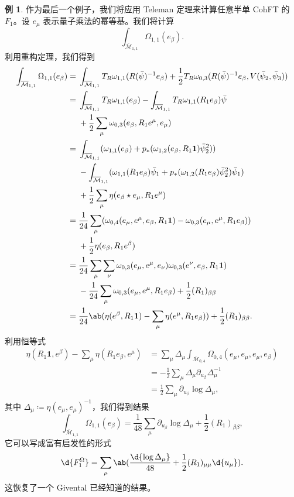 \documentclass{amsart}
\theoremstyle{definition}
\newtheorem{exm}[thm]{例}
\theoremstyle{remark}
\theoremstyle{plain}
\theoremstyle{definition}
\theoremstyle{remark}
\newcommand{\Mbar}{\overline{\mathcal{M}}}
\newcommand{\1}{\mathbf{1}}
\newcommand{\2}{\mathbf{2}}
\newcommand{\3}{\mathbf{3}}
\begin{document}
\begin{exm}
    作为最后一个例子，我们将应用 Teleman 定理来计算任意半单 CohFT 的 $F_1$。设 $e_{\mu}$ 表示量子乘法的幂等基。我们将计算
    \[ \int_{\Mbar_{1,1}} \Omega_{1,1}(e_{\beta}). \]
    利用重构定理，我们得到
    \begin{align*}
        \int_{\Mbar_{1,1}}\Omega_{1,1}(e_{\beta}) ={}& \int_{\Mbar_{1,1}} T_R \omega_{1,1}(R(\bar{\psi})^{-1} e_{\beta}) + \frac{1}{2} T_R \omega_{0,3}(R(\bar{\psi})^{-1} e_{\beta}, V(\bar{\psi}_2, \bar{\psi}_3)) \\
        ={}& \int_{\Mbar_{1,1}}T_R\omega_{1,1}(e_{\beta}) - \int_{\Mbar_{1,1}} T_R \omega_{1,1}(R_1 e_{\beta})\bar{\psi} \\
        &+ \frac{1}{2}\sum_{\mu}  \omega_{0,3}(e_{\beta}, R_1 e^{\mu}, e_{\mu}) \\
        ={}& \int_{\Mbar_{1,1}} ( \omega_{1,1}(e_{\beta}) + p_* ( \omega_{1,2}(e_{\beta}, R_1 \1) \bar{\psi}_2^2 )) \\
        &- \int_{\Mbar_{1,1}} (\omega_{1,1}(R_1 e_{\beta})\bar{\psi}_1 + p_* ( \omega_{1,2}(R_1 e_{\beta}) \bar{\psi}_2^2 ) \bar{\psi}_1) \\
        &+ \frac{1}{2} \sum_{\mu} \eta(e_{\beta} \star e_{\mu}, R_1 e^{\mu}) \\
        ={}& \frac{1}{24} \sum_{\mu} ( \omega_{0,4}(e_{\mu}, e^{\mu}, e_{\beta}, R_1 \1) -\omega_{0,3}(e_{\mu}, e^{\mu}, R_1 e_{\beta}) )\\
        &+ \frac{1}{2} \eta(e_{\beta}, R_1 e^{\beta}) \\
        ={}& \frac{1}{24} \sum_{\mu}\sum_{\nu} \omega_{0,3}(e_{\mu}, e^{\mu}, e_{\nu})\omega_{0,3}(e^{\nu}, e_{\beta}, R_1 \1) \\
        &-\frac{1}{24} \sum_{\mu} \omega_{0,3}(e_{\mu}, e^{\mu}, R_1 e_{\beta}) + \frac{1}{2} (R_1)_{\beta\beta} \\
        ={}& \frac{1}{24} \ab(\eta(e^{\beta}, R_1 \1) - \sum_{\mu} \eta(e^{\mu}, R_1 e_{\beta})) + \frac{1}{2} (R_1)_{\beta\beta}.
    \end{align*}
    利用恒等式
    \begin{align*}
        \eta(R_1 \1, e^{\beta}) - \sum_{\mu} \eta(R_1 e_{\beta}, e^{\mu}) &= \sum_{\mu} \Delta_{\mu} \int_{\Mbar_{0,4}} \Omega_{0,4}(e_{\mu}, e_{\mu}, e_{\mu}, e_{\beta}) \\
        &= -\frac{1}{2}\sum_{\mu} \Delta_{\mu} \partial_{u_{\beta}} \Delta_{\mu}^{-1} \\
        &= \frac{1}{2} \sum_{\mu} \partial_{u_{\beta}} \log \Delta_{\mu},
    \end{align*}
    其中 $\Delta_{\mu} \coloneqq \eta(e_{\mu}, e_{\mu})^{-1}$，我们得到结果
    \[ \int_{\Mbar_{1,1}} \Omega_{1,1}(e_{\beta}) = \frac{1}{48} \sum_{\mu} \partial_{u_{\beta}} \log \Delta_{\mu} + \frac{1}{2} (R_1)_{\beta\beta}, \]
    它可以写成富有启发性的形式
    \[ \d{F_1^{\Omega}} = \sum_{\mu} \ab( \frac{\d{\log \Delta_{\mu}}}{48} + \frac{1}{2} (R_1)_{\mu\mu} \d{u_{\mu}} ). \]
    这恢复了一个 Givental 已经知道的结果。
\end{exm}
\end{document}
